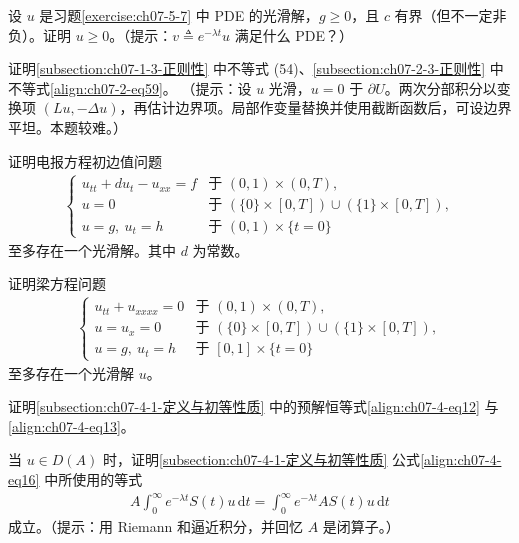 \documentclass[../../main.tex]{subfiles}
\begin{document}
\begin{exercise}\label{exercise:ch07-5-8}
设 $u$ 是习题\cref{exercise:ch07-5-7} 中 PDE 的光滑解，$g\geqslant 0$，且 $c$ 有界（但不一定非负）。证明 $u\geqslant 0$。（提示：$v\triangleq e^{-\lambda t}u$ 满足什么 PDE？）
\end{exercise}

\begin{exercise}\label{exercise:ch07-5-9}
证明\cref{subsection:ch07-1-3-正则性} 中不等式 (54)、\cref{subsection:ch07-2-3-正则性} 中不等式\eqref{align:ch07-2-eq59}。
（提示：设 $u$ 光滑，$u=0$ 于 $\partial U$。两次分部积分以变换项 $(Lu,-\Delta u)$，再估计边界项。局部作变量替换并使用截断函数后，可设边界平坦。本题较难。）
\end{exercise}

\begin{exercise}\label{exercise:ch07-5-10}
证明电报方程初边值问题
\begin{align*}
\begin{cases}
u_{tt}+du_t-u_{xx}=f & \text{于 } (0,1)\times(0,T),\\
u=0 & \text{于 } (\{0\}\times[0,T])\cup(\{1\}\times[0,T]),\\
u=g,\ u_t=h & \text{于 } (0,1)\times\{t=0\}
\end{cases}
\end{align*}
至多存在一个光滑解。其中 $d$ 为常数。
\end{exercise}

\begin{exercise}\label{exercise:ch07-5-11}
证明梁方程问题
\begin{align*}
\begin{cases}
u_{tt}+u_{xxxx}=0 & \text{于 } (0,1)\times(0,T),\\
u=u_x=0 & \text{于 } (\{0\}\times[0,T])\cup(\{1\}\times[0,T]),\\
u=g,\ u_t=h & \text{于 } [0,1]\times\{t=0\}
\end{cases}
\end{align*}
至多存在一个光滑解 $u$。
\end{exercise}

\begin{exercise}\label{exercise:ch07-5-12}
证明\cref{subsection:ch07-4-1-定义与初等性质} 中的预解恒等式\eqref{align:ch07-4-eq12} 与\eqref{align:ch07-4-eq13}。
\end{exercise}

\begin{exercise}\label{exercise:ch07-5-13}
当 $u\in D(A)$ 时，证明\cref{subsection:ch07-4-1-定义与初等性质} 公式\eqref{align:ch07-4-eq16} 中所使用的等式
\begin{align*}
A\int_0^\infty e^{-\lambda t}S(t)u\,\mathrm{d}t=\int_0^\infty e^{-\lambda t}AS(t)u\,\mathrm{d}t
\end{align*}
成立。（提示：用 Riemann 和逼近积分，并回忆 $A$ 是闭算子。）
\end{exercise}
\end{document}
